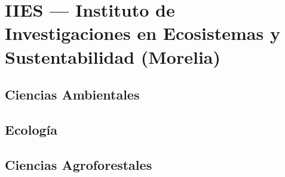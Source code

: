 \section{IIES --- Instituto de Investigaciones en Ecosistemas y Sustentabilidad (Morelia)}

\subsection{Ciencias Ambientales}
\sincodigo

\subsection{Ecología}
\sincodigo

\subsection{Ciencias Agroforestales}
